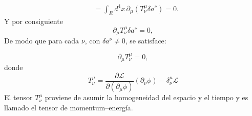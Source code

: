 \begin{align}
    &=\int_{R}d^4x\,
    \partial_\mu \left(T^\mu_\nu\delta a^\nu
  \right)=0.
\end{align}
Y por consiguiente
\begin{equation}
  \partial_\mu T^\mu_\nu\delta a^\nu=0,
\end{equation}
De modo que para cada $\nu$, con $\delta a^\nu\neq0$, se satisface:

\begin{equation}
  \label{eq:131qft}
  \partial_\mu T^\mu_\nu=0,
\end{equation}
donde
\begin{equation}
  \label{eq:tmunu}
    T^\mu_\nu=\frac{\partial\mathcal{L}}{\partial(\partial_\mu\phi)}(\partial_\nu\phi)
      -\delta^\mu_\nu\mathcal{L}
\end{equation}
El tensor $T^\mu_\nu$ proviene de asumir la homogeneidad del espacio y el tiempo y es llamado el tensor de momentum--energía. 

